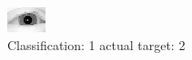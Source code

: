 \begin{figure}[h!]
\begin{center}
\includegraphics[width=0.60\columnwidth]{figures/ID3079_class_1_target_2.png}
\end{center}
\caption{ Classification: 1 actual target: 2}
\label{fig:ID3079_class_1_target_2}
\end{figure}
